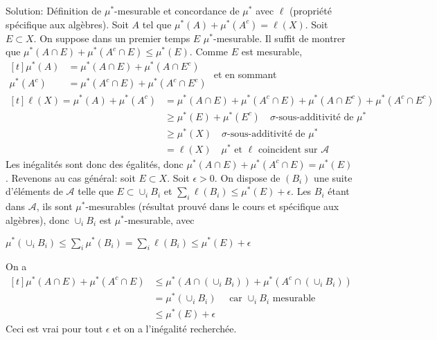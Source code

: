 \documentclass{report}
\begin{document}
Solution:\newline
\fbox{$\Rightarrow$} Définition de $\mu^*$-mesurable et concordance de $\mu^*$ avec $\ell$ (propriété spécifique aux algèbres).\newline
\fbox{$\Leftarrow$}  Soit $A$ tel que $\mu^*(A)+\mu^*(A^c) = \ell(X)$. \newline
Soit $E\subset X$. On suppose dans un premier temps $E$  $\mu^*$-mesurable. Il suffit de montrer que  $\mu^*(A\cap E) + \mu^*(A^c\cap E) \leq \mu^*(E)$.\newline
Comme $E$ est mesurable, $\begin{aligned}[t] \mu^*(A) &= \mu^*(A\cap E)+\mu^*(A\cap E^c) \\ 
\mu^*(A^c) &= \mu^*(A^c\cap E)+\mu^*(A^c\cap E^c)\end{aligned}$\newline \newline
et en sommant $\begin{aligned}[t]\ell(X)=\mu^*(A)+\mu^*(A^c) &= \mu^*(A\cap E)+\mu^*(A^c\cap E)+\mu^*(A\cap E^c)+\mu^*(A^c\cap E^c) \\
&\geq \mu^*(E) + \mu^*(E^c) \quad \text{$\sigma$-sous-additivité de $\mu^*$} \\
&\geq \mu^*(X) \quad \text{$\sigma$-sous-additivité de $\mu^*$} \\
&= \ell(X) \quad \text{$\mu^*$ et $\ell$ coincident sur $\mathcal A$} \end{aligned} $\newline \newline
Les inégalités sont donc des égalités, donc  $\mu^*(A\cap E) + \mu^*(A^c\cap E) = \mu^*(E)$.\newline 
\newline
Revenons au cas général: soit $E\subset X$.  Soit $\epsilon >0$. On dispose de $(B_i)$ une suite d'éléments de $\mathcal A$ telle que $E\subset \cup_i B_i$ et $\sum_i \ell(B_i)\leq \mu^*(E) + \epsilon$. \newline Les $B_i$ étant dans $\mathcal A$, ils sont $\mu^*$-mesurables (résultat prouvé dans le cours et spécifique aux algèbres), donc $\cup_i B_i$ est $\mu^*$-mesurable, avec \newline 
\centerline{$\mu^*(\cup_i B_i)\leq \sum_i \mu^*(B_i) = \sum_i \ell (B_i) \leq \mu^*(E)+\epsilon$ } \newline
On a $$\begin{aligned}[t]\mu^*(A\cap E) + \mu^*(A^c\cap E) &\leq \mu^*(A\cap (\cup_i B_i)) + \mu^*(A^c\cap (\cup_i B_i)) \\
&= \mu^*(\cup_i B_i) \quad \text{ car $\cup_i B_i$ mesurable} \\
&\leq \mu^*(E)+\epsilon\end{aligned}
$$
Ceci est vrai pour tout $\epsilon$ et on a l'inégalité recherchée.
\newpage 
\end{document}
